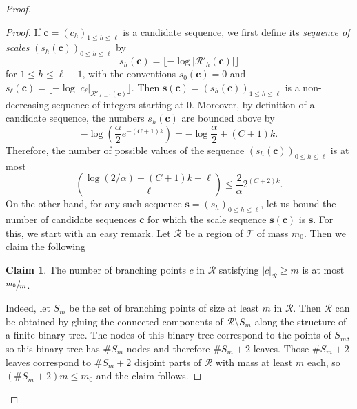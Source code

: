 \documentclass[11pt]{article}
\let\backslash\setminus
\newcommand{\Rr}{\mathcal{R}}
\theoremstyle{plain}
\theoremstyle{definition}
\newtheorem*{claim*}{Claim}
\numberwithin{equation}{section}
\begin{document}
\begin{proof}
\begin{figure}[htb]
\end{figure}
\begin{proof}
If $\mathbf{c}=(c_h)_{1 \leq h \leq \ell}$ is a candidate sequence, we first define its \emph{sequence of scales} $\left( s_h(\mathbf{c}) \right)_{0 \leq h \leq \ell}$ by
\[ s_h(\mathbf{c}) = \lfloor -\log \left| \Rr'_h(\mathbf{c}) \right| \rfloor \]
for $1 \leq h \leq \ell-1$, with the conventions $s_0(\mathbf{c})=0$ and $s_{\ell}(\mathbf{c})=\lfloor -\log |c_{\ell}|_{\Rr'_{\ell-1}(\mathbf{c})} \rfloor$.
Then $\mathbf{s}(\mathbf{c})=\left( s_h(\mathbf{c}) \right)_{1 \leq h \leq \ell}$ is a non-decreasing sequence of integers starting at $0$.
Moreover, by definition of a candidate sequence, the numbers $s_h(\mathbf{c})$ are bounded above by
\[ -\log \left( \frac{\alpha}{2} e^{-(C+1)k}\right) = -\log \frac{\alpha}{2} + (C+1) k.\]
Therefore, the number of possible values of the sequence $\left( s_h(\mathbf{c}) \right)_{0 \leq h \leq \ell}$ is at most
\begin{equation}\label{eqn_number_scale_sequences}
\binom{\log (2/\alpha) + (C+1)k + \ell}{\ell} \leq \frac{2}{\alpha} 2^{(C+2)k}.
\end{equation}
On the other hand, for any such sequence $\mathbf{s}=(s_h)_{0 \leq h \leq \ell}$, let us bound the number of candidate sequences $\mathbf{c}$ for which the scale sequence $\mathbf{s}(\mathbf{c})$ is $\mathbf{s}$.
For this, we start with an easy remark.
Let $\Rr$ be a region of $\mathcal{T}$ of mass $m_0$.
Then we claim the following
\begin{claim*}
The number of branching points $c$ in $\Rr$ satisfying $|c|_{\Rr} \geq m$ is at most $\sfrac{m_0}{m}$.
\end{claim*}
Indeed, let $S_m$ be the set of branching points of size at least $m$ in $\Rr$.
Then $\Rr$ can be obtained by gluing the connected components of $\Rr \backslash S_m$ along the structure of a finite binary tree.
The nodes of this binary tree correspond to the points of $S_m$, so this binary tree has $\# S_m$ nodes and therefore $\# S_m+2$ leaves.
Those $\# S_m+2$ leaves correspond to $\# S_m+2$ disjoint parts of $\Rr$ with mass at least $m$ each, so $\left( \# S_m+2 \right) m \leq m_0$ and the claim follows.


\end{proof}
\end{proof}
\end{document}
